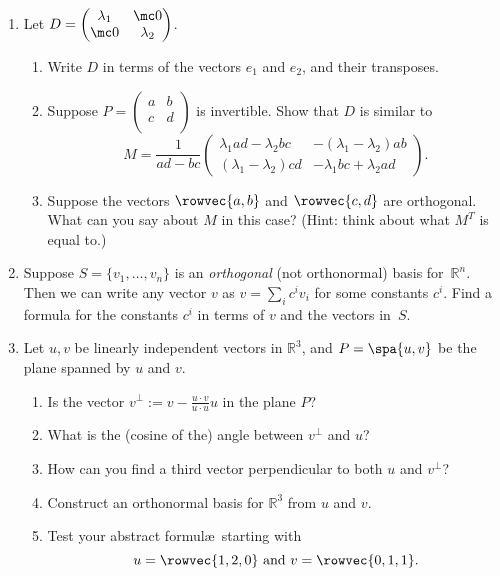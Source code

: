 


\begin{enumerate}

\item Let $D=\begin{pmatrix}
\lambda_1 & \mc0 \\
\mc0 & \lambda_2 \\
\end{pmatrix}$.
\begin{enumerate}
\item Write $D$ in terms of the vectors $e_1$ and $e_2$, and their transposes.
\item Suppose $P=\begin{pmatrix}
a & b \\
c & d \\
\end{pmatrix}$ is invertible.  Show that $D$ is similar to
\[
M=\frac{1}{ad-bc}\begin{pmatrix}
\lambda_1ad-\lambda_2bc & -(\lambda_1-\lambda_2)ab \\[1mm]
(\lambda_1-\lambda_2)cd & -\lambda_1bc + \lambda_2ad
\end{pmatrix}.
\]
\item Suppose the vectors $\rowvec{a,b}$ and $\rowvec{c,d}$ are orthogonal.  What can you say about $M$ in this case? (Hint: think about what \(M^T\) is equal to.)
\end{enumerate}


\item \label{orthogprob} Suppose $S=\{v_1, \ldots, v_n \}$ is an \emph{orthogonal} (not orthonormal) basis for~$\mathbb{R}^n$.  Then we can write any vector $v$ as $v=\sum_ic^iv_i$ for some constants $c^i$.  Find a formula for the constants $c^i$ in terms of $v$ and the vectors in~$S$.


\item \label{orthogprojprob} Let $u,v$ be linearly independent vectors in $\mathbb{R}^3$, and $P=\spa \{ u,v\}$ be the plane spanned by $u$ and $v$.  
\begin{enumerate}
\item Is the vector $v^\bot := v-\frac{u\cdot v}{u\cdot u}u$ in the plane $P$?
\item  What is the (cosine of the) angle between $v^\bot$ and $u$?
\item %
How can you find a third vector perpendicular to both $u$ and $v^\bot$?
\item  Construct an orthonormal basis for $\mathbb{R}^3$ from $u$ and $v$.
\item  Test your abstract formul\ae\ starting with 
\[
u=\rowvec{1 , 2 , 0} \text{ and } v=\rowvec{0 , 1 , 1}.
\]
\end{enumerate}


\end{enumerate}
